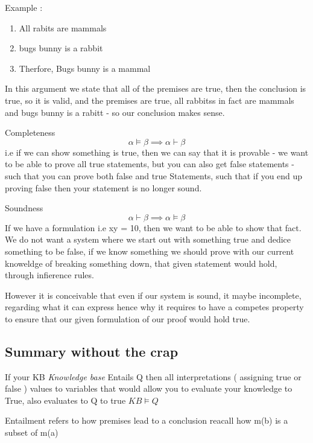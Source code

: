 \documentclass{article}
\theoremstyle{mytheoremstyle}
\theoremstyle{mytheoremstyle}
\theoremstyle{myproblemstyle}
\begin{document}
Example :

\begin{enumerate}
    \item All rabits are mammals
    \item bugs bunny is a rabbit
    \item Therfore, Bugs bunny is a mammal
\end{enumerate}
In this argument we state that all of the premises are true, then the conclusion is true, so it is valid, and the premises are true, all rabbitss in fact are mammals and bugs bunny is a rabitt - so our conclusion makes sense.

\begin{definition}
    Completeness
    \begin{displaymath}
        \alpha \models \beta \implies \alpha \vdash \beta
    \end{displaymath}
    i.e if we can show something is true, then we can say that it is provable - we want to be able to prove all true statements, but you can also get false statements - such that you can prove both false and true Statements, such that if you end up proving false then your statement is no longer sound.
\end{definition}
\newpage

\begin{definition}
    Soundness
    \begin{displaymath}
        \alpha \vdash \beta \implies \alpha \models \beta
    \end{displaymath}
    If we have a formulation i.e xy = 10, then we want to be able to show that fact. We do not want a system where we start out with something true and dedice something to be false, if we know something we should prove with our current knoweldge of breaking something down, that given statement would hold, through infierence rules.

    However it is conceivable that even if our system is sound, it maybe incomplete, regarding what it can express hence why it requires to have a competes property to ensure that our given formulation of our proof would hold true.


\end{definition}


\subsection{Summary without the crap }
If your KB \textit{Knowledge base }Entails Q then all interpretations ( assigning true or false ) values to variables that would allow you to evaluate your knowledge to True, also evaluates to Q to true
\begin{math}
    KB \models Q
\end{math}
\item Entailment refers to how premises lead to a conclusion
reacall how m(b) is a subset of m(a)
\end{document}
